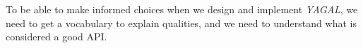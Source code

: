 \label{cha:designPrinciples}
To be able to make informed choices when we design and implement \textit{YAGAL}, we need to get a vocabulary to explain qualities, and we need to understand what is considered a good API.